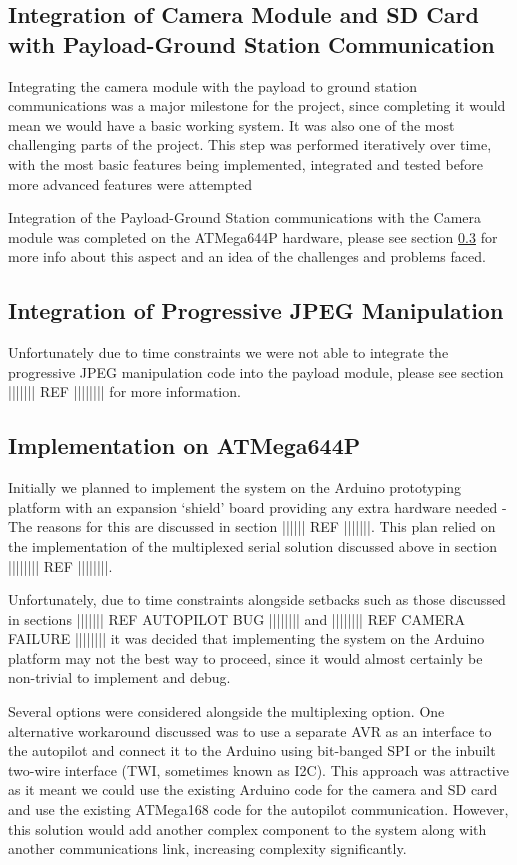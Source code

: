 \subsection{Integration of Camera Module and SD Card with Payload-Ground Station Communication}
Integrating the camera module with the payload to ground station communications
was a major milestone for the project, since completing it would mean we would
have a basic working system. It was also one of the most challenging parts of
the project. This step was performed iteratively over time, with the most basic
features being implemented, integrated and tested before more advanced features
were attempted

Integration of the Payload-Ground Station communications with the Camera module
was completed on the ATMega644P hardware, please see section \ref{sec:atmega644p_impl}
for more info about this aspect and an idea of the challenges and problems
faced.

\subsection{Integration of Progressive JPEG Manipulation}
Unfortunately due to time constraints we were not able to integrate the
progressive JPEG manipulation code into the payload module, please see section
||||||| REF |||||||| for more information.

\subsection{Implementation on ATMega644P}
\label{sec:atmega644p_impl}
Initially we planned to implement the system on the Arduino prototyping 
platform with an expansion `shield' board providing any extra hardware needed -
The reasons for this are discussed in section |||||| REF |||||||. 
This plan relied on the implementation of the multiplexed serial solution 
discussed above in section |||||||| REF ||||||||. 

Unfortunately, due to time constraints alongside setbacks such as those
discussed in sections ||||||| REF AUTOPILOT BUG |||||||| and |||||||| REF 
CAMERA FAILURE |||||||| it was decided that implementing the system on the 
Arduino platform may not the best way to proceed, since it would almost 
certainly be non-trivial to implement and debug.

Several options were considered alongside the multiplexing option. One 
alternative workaround discussed was to use a separate AVR as an interface
to the autopilot and connect it to the Arduino using bit-banged SPI or the
inbuilt two-wire interface (TWI, sometimes known as I2C). This approach was 
attractive as it meant we could use the existing Arduino code for the camera 
and SD card and use the existing ATMega168 code for the autopilot communication.
However, this solution would add another complex component to the system along
with another communications link, increasing complexity significantly.

